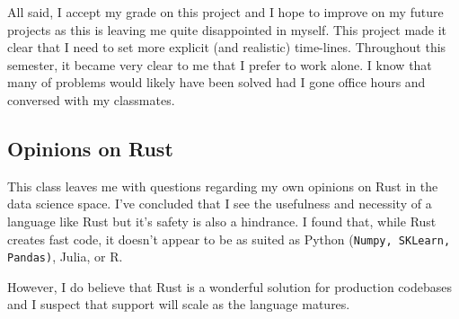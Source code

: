 \documentclass[12pt,letterpaper]{article}
\begin{document}
All said, I accept my grade on this project and I hope to improve on my future projects as this is leaving me quite disappointed in myself.  This project made it clear that I need to set more explicit (and realistic) time-lines.  Throughout this semester, it became very clear to me that I prefer to work alone.  I know that many of problems would likely have been solved had I gone office hours and conversed with my classmates. 

\subsection{Opinions on Rust}
This class leaves me with questions regarding my own opinions on Rust in the data science space. I've concluded that I see the usefulness and necessity of a language like Rust but it's safety is also a hindrance.  I found that, while Rust creates fast code, it doesn't appear to be as suited as Python (\texttt{Numpy, SKLearn, Pandas)}, Julia, or R.  

However, I do believe that Rust is a wonderful solution for production codebases and I suspect that support will scale as the language matures. 
\end{document}
